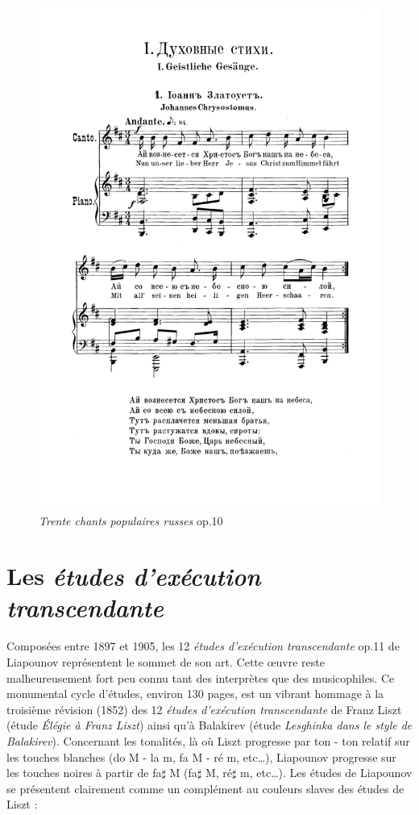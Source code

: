 \begin{figure}[!p]
  \includegraphics[width=16cm, keepaspectratio]{chanson.png}
  \caption{\label{chanson}\emph{Trente chants populaires russes} op.10 }
\end{figure}
\newpage

\section{Les \emph{études d'exécution transcendante}}

Composées entre 1897 et 1905, les 12 \emph{études d'exécution transcendante} op.11 de Liapounov représentent le sommet de son art. Cette œuvre reste malheureusement fort peu connu tant des interprètes que des musicophiles. Ce monumental cycle d'études, environ 130 pages, est un vibrant hommage à la troisième révision (1852) des 12 \emph{études d'exécution transcendante} de Franz Liszt (étude  \emph{Élégie à Franz Liszt}) ainsi qu'à Balakirev (étude  \emph{Lesghinka dans le style de Balakirev}). Concernant les tonalités, là où Liszt progresse par ton - ton relatif sur les touches blanches (do M - la m, fa M - ré m, etc\dots), Liapounov progresse sur les touches noires à partir de fa$\sharp$ M (fa$\sharp$ M, ré$\sharp$ m, etc\dots). Les études de Liapounov se présentent clairement comme un complément au couleurs slaves des études de Liszt :

